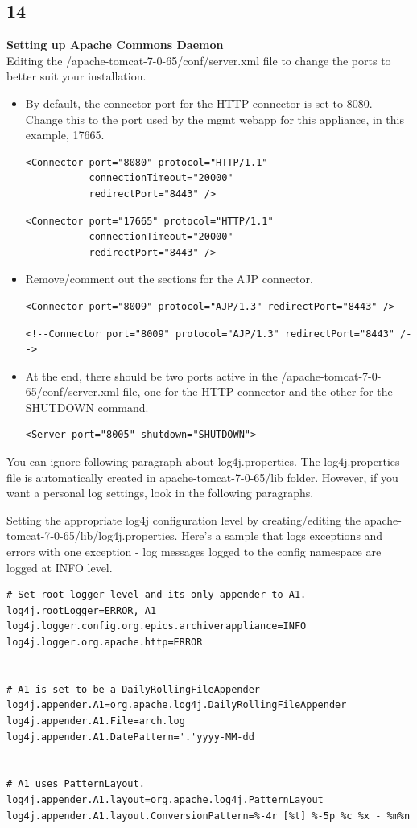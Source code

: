 \documentclass[11pt
  , a4paper
  , article
  , oneside
]{memoir}
\begin{document}
\subsection{14}
\textbf{Setting up Apache Commons Daemon}\\
Editing the /apache-tomcat-7-0-65/conf/server.xml file to change the ports to better suit your installation.
\begin{itemize}
	\item 
	By default, the connector port for the HTTP connector is set to 8080. Change this to the port used by the mgmt webapp for this appliance, in this example, 17665.
\begin{lstlisting}[style=termstyle]
<Connector port="8080" protocol="HTTP/1.1"
	       connectionTimeout="20000"
	       redirectPort="8443" />
\end{lstlisting}
\begin{lstlisting}[style=termstyle]
<Connector port="17665" protocol="HTTP/1.1"
           connectionTimeout="20000"
           redirectPort="8443" />
\end{lstlisting}
	\item Remove/comment out the sections for the AJP connector.
\begin{lstlisting}[style=termstyle]
<Connector port="8009" protocol="AJP/1.3" redirectPort="8443" />
\end{lstlisting}
\begin{lstlisting}[style=termstyle]
<!--Connector port="8009" protocol="AJP/1.3" redirectPort="8443" /-->
\end{lstlisting}
	\item At the end, there should be two ports active in the /apache-tomcat-7-0-65/conf/server.xml file, one for the HTTP connector and the other for the SHUTDOWN command.
\begin{lstlisting}[style=termstyle]
<Server port="8005" shutdown="SHUTDOWN">
\end{lstlisting}
\end{itemize}
You can ignore following paragraph about log4j.properties. The log4j.properties file is automatically created in apache-tomcat-7-0-65/lib folder. However, if you want a personal log settings, look in the following paragraphs. 

Setting the appropriate log4j configuration level by creating/editing the apache-tomcat-7-0-65/lib/log4j.properties. Here's a sample that logs exceptions and errors with one exception - log messages logged to the config namespace are logged at INFO level.
\begin{lstlisting}[style=termstyle]
# Set root logger level and its only appender to A1.
log4j.rootLogger=ERROR, A1
log4j.logger.config.org.epics.archiverappliance=INFO
log4j.logger.org.apache.http=ERROR


# A1 is set to be a DailyRollingFileAppender
log4j.appender.A1=org.apache.log4j.DailyRollingFileAppender
log4j.appender.A1.File=arch.log
log4j.appender.A1.DatePattern='.'yyyy-MM-dd


# A1 uses PatternLayout.
log4j.appender.A1.layout=org.apache.log4j.PatternLayout
log4j.appender.A1.layout.ConversionPattern=%-4r [%t] %-5p %c %x - %m%n
\end{lstlisting}
\end{document}
